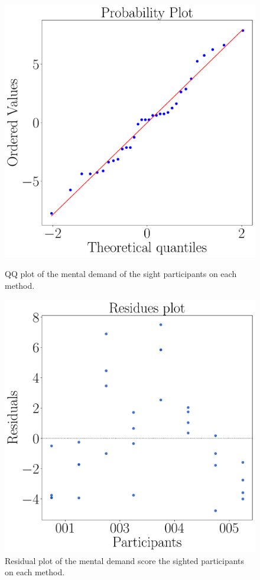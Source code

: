 \begin{figure}[!htb]
    \centering
    \vspace{-15.0cm}
    \begin{minipage}{0.45\textwidth}
        \centering
        \includegraphics[width = 0.8\linewidth]{Resultados/Nasa/Figuras/pdf/qqplot_md_avg_two_way_sight.pdf}
        \caption{QQ plot of the mental demand of the sight participants on each method.}
        \label{fig:qqplot_md_avg_two_way_sight}
    \end{minipage}
    \begin{minipage}{0.075\textwidth}
        \hfill
    \end{minipage}
    \begin{minipage}{0.45\textwidth}
        \centering
        \includegraphics[width = 0.8\linewidth]{Resultados/Nasa/Figuras/pdf/residplot_md_avg_two_way_sight.pdf}
        \caption{Residual plot of the mental demand score the sighted participants on each method.}
        \label{fig:residplot_md_avg_two_way_sight}
    \end{minipage}
\end{figure}

